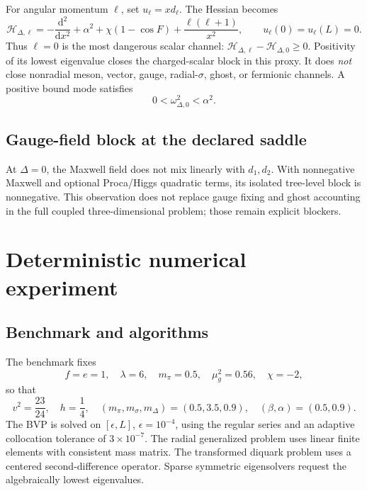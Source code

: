 \documentclass[11pt]{article}
\theoremstyle{definition}
\theoremstyle{remark}
\newcommand{\dd}{\mathrm d}
\newcommand{\cH}{\mathcal H}
\begin{document}
For angular momentum \(\ell\), set \(u_\ell=xd_\ell\).  The Hessian becomes
\begin{equation}
 \cH_{\Delta,\ell}
 =-\frac{\dd^2}{\dd x^2}+\alpha^2+\chi(1-\cos F)
 +\frac{\ell(\ell+1)}{x^2},
 \qquad u_\ell(0)=u_\ell(L)=0.
 \label{eq:diquark-operator}
\end{equation}
Thus \(\ell=0\) is the most dangerous scalar channel:
\(\cH_{\Delta,\ell}-\cH_{\Delta,0}\ge0\).  Positivity of its lowest
eigenvalue closes the charged-scalar block in this proxy.  It does
\emph{not} close nonradial meson, vector, gauge, radial-\(\sigma\), ghost, or
fermionic channels.  A positive bound mode satisfies
\begin{equation}
 0<\omega_{\Delta,0}^2<\alpha^2.
\end{equation}

\subsection{Gauge-field block at the declared saddle}

At \(\Delta=0\), the Maxwell field does not mix linearly with
\(d_1,d_2\).  With nonnegative Maxwell and optional Proca/Higgs quadratic
terms, its isolated tree-level block is nonnegative.  This observation does
not replace gauge fixing and ghost accounting in the full coupled
three-dimensional problem; those remain explicit blockers.

\section{Deterministic numerical experiment}

\subsection{Benchmark and algorithms}

The benchmark fixes
\begin{equation}
 f=e=1,\quad \lambda=6,\quad m_\pi=0.5,\quad
 \mu_g^2=0.56,\quad \chi=-2,
 \label{eq:benchmark}
\end{equation}
so that
\[
 v^2=\frac{23}{24},\quad h=\frac14,\quad
 (m_\pi,m_\sigma,m_\Delta)=(0.5,3.5,0.9),\quad
 (\beta,\alpha)=(0.5,0.9).
\]
The BVP is solved on \([\epsilon,L]\), \(\epsilon=10^{-4}\), using the
regular series and an adaptive collocation tolerance of \(3\times10^{-7}\).
The radial generalized problem uses linear finite elements with consistent
mass matrix.  The transformed diquark problem uses a centered
second-difference operator.  Sparse symmetric eigensolvers request the
algebraically lowest eigenvalues.
\end{document}
